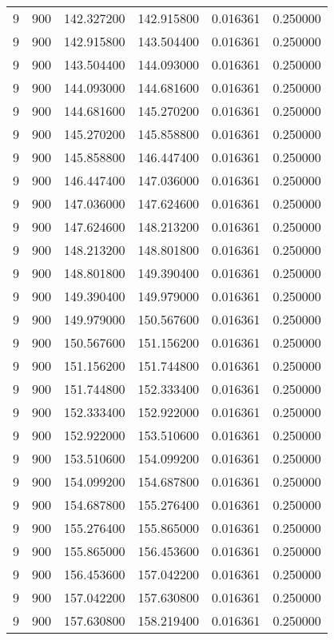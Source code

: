 \begin{longtable}{rrrrrr}
9 & 900 & 142.327200 & 142.915800 & 0.016361 & 0.250000 \\
9 & 900 & 142.915800 & 143.504400 & 0.016361 & 0.250000 \\
9 & 900 & 143.504400 & 144.093000 & 0.016361 & 0.250000 \\
9 & 900 & 144.093000 & 144.681600 & 0.016361 & 0.250000 \\
9 & 900 & 144.681600 & 145.270200 & 0.016361 & 0.250000 \\
9 & 900 & 145.270200 & 145.858800 & 0.016361 & 0.250000 \\
9 & 900 & 145.858800 & 146.447400 & 0.016361 & 0.250000 \\
9 & 900 & 146.447400 & 147.036000 & 0.016361 & 0.250000 \\
9 & 900 & 147.036000 & 147.624600 & 0.016361 & 0.250000 \\
9 & 900 & 147.624600 & 148.213200 & 0.016361 & 0.250000 \\
9 & 900 & 148.213200 & 148.801800 & 0.016361 & 0.250000 \\
9 & 900 & 148.801800 & 149.390400 & 0.016361 & 0.250000 \\
9 & 900 & 149.390400 & 149.979000 & 0.016361 & 0.250000 \\
9 & 900 & 149.979000 & 150.567600 & 0.016361 & 0.250000 \\
9 & 900 & 150.567600 & 151.156200 & 0.016361 & 0.250000 \\
9 & 900 & 151.156200 & 151.744800 & 0.016361 & 0.250000 \\
9 & 900 & 151.744800 & 152.333400 & 0.016361 & 0.250000 \\
9 & 900 & 152.333400 & 152.922000 & 0.016361 & 0.250000 \\
9 & 900 & 152.922000 & 153.510600 & 0.016361 & 0.250000 \\
9 & 900 & 153.510600 & 154.099200 & 0.016361 & 0.250000 \\
9 & 900 & 154.099200 & 154.687800 & 0.016361 & 0.250000 \\
9 & 900 & 154.687800 & 155.276400 & 0.016361 & 0.250000 \\
9 & 900 & 155.276400 & 155.865000 & 0.016361 & 0.250000 \\
9 & 900 & 155.865000 & 156.453600 & 0.016361 & 0.250000 \\
9 & 900 & 156.453600 & 157.042200 & 0.016361 & 0.250000 \\
9 & 900 & 157.042200 & 157.630800 & 0.016361 & 0.250000 \\
9 & 900 & 157.630800 & 158.219400 & 0.016361 & 0.250000 \\

\end{longtable}
